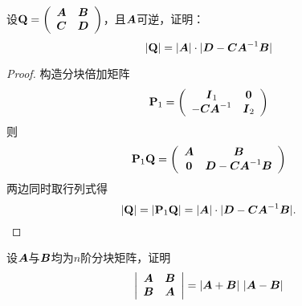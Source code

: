 \begin{frame}\ft{\secname}

  \begin{li}
    设$\QQ=\left(
      \begin{array}{cc}
        \A&\B\\
        \C&\D
      \end{array}
    \right)$，且$\A$可逆，证明：
    $$
    |\QQ| = |\A| \cdot |\D-\C\A^{-1}\B|
    $$
  \end{li}\pause
\begin{proof}
  构造分块倍加矩阵
  $$
  \PP_1 = \left(
    \begin{array}{cc}
      \II_1 & \zero\\
      -\C\A^{-1} & \II_2
    \end{array}
  \right)
  $$ \pause
  则
  $$
  \PP_1 \QQ = \left(
    \begin{array}{cc}
      \A & \B\\
      \zero & \D-\C\A^{-1}\B
    \end{array}
  \right)
  $$
\pause
  两边同时取行列式得
  $$
  |\QQ| = |\PP_1\QQ| = |\A|\cdot |\D-\C\A^{-1}\B|.
  $$
\end{proof}
\end{frame}

\begin{frame}\ft{\secname}
  \begin{li}
    设$\A$与$\B$均为$n$阶分块矩阵，证明
    $$
    \left|
      \begin{array}{cc}
        \A&\B\\
        \B&\A
      \end{array}
    \right| = |\A+\B|~|\A-\B|
    $$
  \end{li}
\end{frame}

